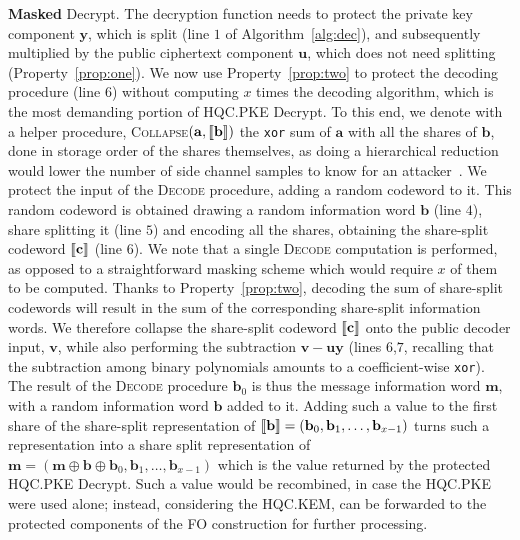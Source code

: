 \noindent\textbf{Masked} \textsf{Decrypt}. The decryption function needs to 
protect the private key component $\mathbf{y}$, which is split (line $1$ of 
Algorithm~\ref{alg:dec}), and subsequently multiplied by the public ciphertext
component $\mathbf{u}$, which does not need splitting (Property~\ref{prop:one}).
We now use Property~\ref{prop:two} to protect the decoding procedure (line $6$)
without computing $x$ times the decoding algorithm, which is the most demanding
portion of HQC.PKE \textsf{Decrypt}.
To this end, we denote with a helper procedure, \textsc{Collapse}$(\mathbf{a},  \llbracket \mathbf{b} \rrbracket )$ the \texttt{xor} sum of $\mathbf{a}$ with all the shares of
$\mathbf{b}$, done in storage order of the shares themselves, as doing a hierarchical
reduction would lower the number of side channel samples to know for an attacker~\cite{ishai2003private,prouff2013masking}.
We protect the input of the \textsc{Decode} procedure, adding a random codeword
to it. This random codeword is obtained drawing a random information word 
$\mathbf{b}$ (line $4$), share splitting it (line $5$) and encoding all the shares, 
obtaining the share-split codeword $ \llbracket \mathbf{c} \rrbracket $ (line $6$).
We note that a single \textsc{Decode} computation is performed, as opposed
to a straightforward masking scheme which would require $x$ of them to be 
computed.
Thanks to Property~\ref{prop:two}, decoding the sum of share-split codewords
will result in the sum of the corresponding share-split information words.
We therefore collapse the share-split codeword $ \llbracket \mathbf{c} \rrbracket $ onto the
public decoder input, $\mathbf{v}$, while also performing the subtraction 
$\mathbf{v}-\mathbf{uy}$ (lines $6$,$7$, recalling that the subtraction 
among binary polynomials amounts to a coefficient-wise \texttt{xor}).
The result of the \textsc{Decode} procedure $\mathbf{b}_0$ is thus the message 
information word $\mathbf{m}$, with a random information word $\mathbf{b}$ 
added to it.
Adding such a value to the first share of the share-split representation of
$ \llbracket \mathbf{b} \rrbracket = (\mathbf{b}_0,\mathbf{b}_1, \ldots,\mathbf{b}_{x-1} )$ turns such a representation into a share split representation of
$\mathbf{m}=(\mathbf{m} \oplus \mathbf{b} \oplus\mathbf{b}_0,\mathbf{b}_1, \ldots,\mathbf{b}_{x-1} )$ which is the value returned by the protected HQC.PKE \textsf{Decrypt}.
Such a value would be recombined, in case the HQC.PKE were used alone; instead, 
considering the HQC.KEM, can be forwarded to the protected components of the FO
construction for further processing.
